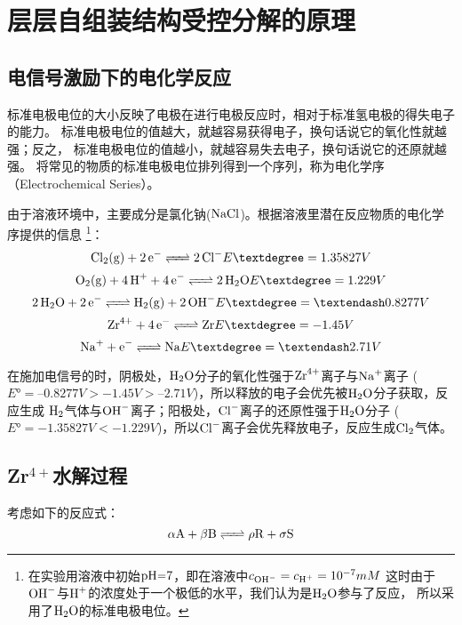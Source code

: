 \section{层层自组装结构受控分解的原理}
\subsection{电信号激励下的电化学反应}
标准电极电位的大小反映了电极在进行电极反应时，相对于标准氢电极的得失电子的能力。
标准电极电位的值越大，就越容易获得电子，换句话说它的氧化性就越强；反之，
标准电极电位的值越小，就越容易失去电子，换句话说它的还原就越强\cite{Trasatti1980}。
将常见的物质的标准电极电位排列得到一个序列，称为电化学序（Electrochemical Series）。

由于溶液环境中，主要成分是氯化钠($\ce{NaCl}$)。根据溶液里潜在反应物质的电化学序提供的信息\cite{Weik2001}
\footnote{在实验用溶液中初始$\ce{pH=7}$，即在溶液中$c_{\ce{OH-}}=c_{\ce{H+}}=10^{-7}mM$
这时由于$\ce{OH-}$与$\ce{H+}$的浓度处于一个极低的水平，我们认为是$\ce{H2O}$参与了反应，
所以采用了$\ce{H2O}$的标准电极电位。}：
\begin{equation}
    \ce{Cl2(g) + 2e- <=> 2 Cl-} \quad E°=1.35827V
\end{equation}
\begin{equation}
    \ce{O2(g) + 4H+ + 4 e- <=> 2H2O} \quad E°=1.229V
\end{equation}
\begin{equation}
    \ce{2 H2O + 2 e- <=> H2(g) + 2OH- } \quad E°=–0.8277V
    \label{equation:cathode_reaction}
\end{equation}
\begin{equation}
    \ce{Zr^4+ + 4e- <=> Zr} \quad E°=-1.45V
\end{equation}
\begin{equation}
    \ce{Na+ + e- <=> Na } \quad E°=–2.71V
\end{equation}

在施加电信号的时，阴极处，$\ce{H2O}$分子的氧化性强于$\ce{Zr^4+}$离子与$\ce{Na+}$离子
($E°=–0.8277V>-1.45V>–2.71V$)，所以释放的电子会优先被$\ce{H2O}$分子获取，反应生成
$\ce{H2}$气体与$\ce{OH-}$离子；阳极处，$\ce{Cl-}$离子的还原性强于$\ce{H2O}$分子
($E°=-1.35827V<-1.229V$)，所以$\ce{Cl-}$离子会优先释放电子，反应生成$\ce{Cl2}$气体。

\subsection{Zr$^{4+}$水解过程}
考虑如下的反应式：
\begin{equation}
    \ce{\alpha{A} +\beta{B} <=> \rho{R} + \sigma{S}}
\end{equation}

